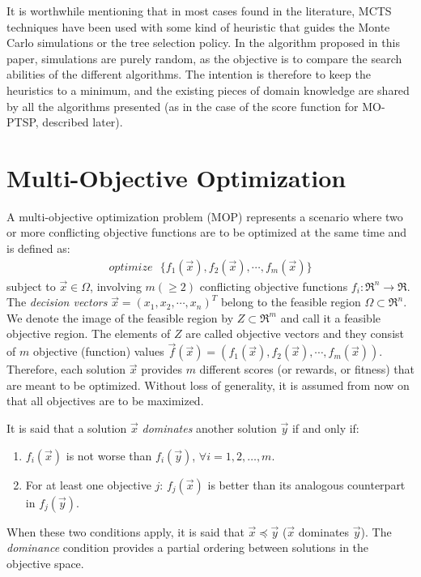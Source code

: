 \documentclass[journal]{IEEEtran}
\begin{document}
It is worthwhile mentioning that in most cases found in the literature, MCTS techniques have been used with some kind of heuristic that guides the Monte Carlo simulations or the tree selection policy. In the algorithm proposed in this paper, simulations are purely random, as the objective is to compare the search abilities of the different algorithms. The intention is therefore to keep the heuristics to a minimum, and the existing pieces of domain knowledge are shared by all the algorithms presented (as in the case of the score function for MO-PTSP, described later).


\section{Multi-Objective Optimization} \label{sec:moo}

A multi-objective optimization problem (MOP) represents a scenario where two or more conflicting objective functions are to be optimized at the same time and is defined as: 
\begin{eqnarray}
optimize ~~~\{ f_1(\vec x), f_2(\vec x),\cdots , f_m(\vec x) \} 
\end{eqnarray}
subject to $\vec x \in \Omega$, involving $m (\geq 2)$ conflicting objective functions $f_i : \Re ^n \rightarrow \Re$. The \textit{decision vectors} 
$\vec x = (x_1, x_2, \cdots, x_n)^T$ belong to the feasible region $\Omega \subset \Re ^n$. We denote the image of the feasible region by $Z\subset \Re ^m$ and call it a feasible objective region. The
elements of $Z$ are called objective vectors and they consist of $m$ objective (function) values $\vec f(\vec x)= (f_1(\vec x), f_2(\vec x), \cdots, f_m(\vec x))$.
Therefore, each solution $\vec x$ provides $m$ different scores (or rewards, or fitness) that are meant to be optimized. Without loss of generality, it is assumed from now on that all objectives are to be maximized.

It is said that a solution $\vec x$ \textit{dominates} another solution $\vec y$ if and only if:
\begin{enumerate}
\item $f_i(\vec x)$ is not worse than $f_i(\vec y)$, $\forall i = 1, 2, \dots, m$.
\item For at least one objective $j$: $f_j(\vec x)$ is better than its analogous counterpart in $f_j(\vec y)$.
\end{enumerate}

When these two conditions apply, it is said that $\vec x \preceq \vec y$ ($\vec x$ dominates $\vec y$). The \textit{dominance} condition provides a partial ordering between solutions in the objective space.
\end{document}
